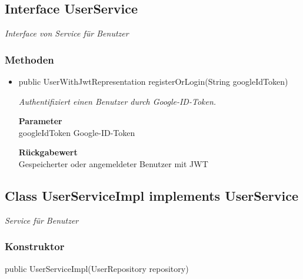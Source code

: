 \documentclass[a4paper]{scrreprt}
\begin{document}
    \subsection{Interface UserService}
    \textit{Interface von Service für Benutzer}
    \subsubsection{Methoden}
    \begin{itemize}
    	\item{public UserWithJwtRepresentation registerOrLogin(String googleIdToken)}
    	
    	\textit{Authentifiziert einen Benutzer durch Google-ID-Token.}
    	
    	\textbf{Parameter} \\
    	googleIdToken Google-ID-Token
    	
    	\textbf{Rückgabewert} \\
    	Gespeicherter oder angemeldeter Benutzer mit JWT
    \end{itemize}
    \subsection{Class UserServiceImpl implements UserService}
    \textit{Service für Benutzer}
    \subsubsection{Konstruktor}
    public UserServiceImpl(UserRepository repository)
\end{document}
